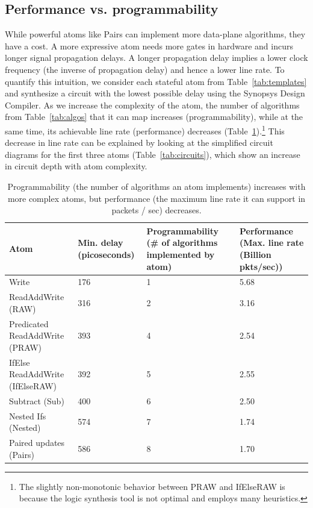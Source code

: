 \subsection{Performance vs. programmability}
\label{ss:perfprog}
While powerful atoms like Pairs can implement more data-plane algorithms, they
have a cost.  A more expressive atom needs more gates in hardware and incurs
longer signal propagation delays. A longer propagation delay implies a lower
clock frequency (the inverse of propagation delay) and hence a lower line rate.
To quantify this intuition, we consider each stateful atom from
Table~\ref{tab:templates} and synthesize a circuit with the lowest possible
delay using the Synopsys Design Compiler. As we increase the complexity of the
atom, the number of algorithms from Table~\ref{tab:algos} that it can map
increases (programmability), while at the same time, its achievable line rate
(performance) decreases (Table~\ref{tab:perfprog}).\footnote{The slightly
non-monotonic behavior between PRAW and IfElseRAW is because the logic
synthesis tool is not optimal and employs many heuristics.} This decrease in
line rate can be explained by looking at the simplified circuit diagrams for
the first three atoms (Table~\ref{tab:circuits}), which show an increase in
circuit depth with atom complexity.

\begin{table}[!t]
  \begin{scriptsize}
  \begin{tabular}{|p{}|p{}|p{}|p{}|}
  \hline
  Atom & Min. delay (picoseconds) & Programmability (\# of algorithms implemented by atom) & Performance (Max. line rate (Billion pkts/sec)) \\
  \hline
  Write & 176 & 1  & 5.68 \\
  \hline
  ReadAddWrite (RAW) & 316 & 2 & 3.16\\
  \hline
  \pbox{0.1\textwidth}
  {Predicated\\
  ReadAddWrite (PRAW)} & 393 & 4 & 2.54 \\
  \hline
  IfElse ReadAddWrite (IfElseRAW) & 392 & 5 & 2.55 \\
  \hline
  Subtract (Sub) & 400 & 6 & 2.50 \\
  \hline
  Nested Ifs (Nested) & 574 & 7 & 1.74 \\
  \hline
  Paired updates (Pairs) & 586 & 8 & 1.70 \\
  \hline
  \end{tabular}
\end{scriptsize}
\caption{Programmability (the number of algorithms an atom implements)
increases with more complex atoms, but performance (the maximum line rate it
can support in packets / sec) decreases.}
\label{tab:perfprog}
\end{table}

